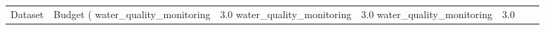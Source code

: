 \begin{tabular}{llrlrrr}
\toprule
Dataset & Budget (%
\midrule
water_quality_monitoring & 3.0%
water_quality_monitoring & 3.0%
water_quality_monitoring & 3.0%
\bottomrule
\end{tabular}

